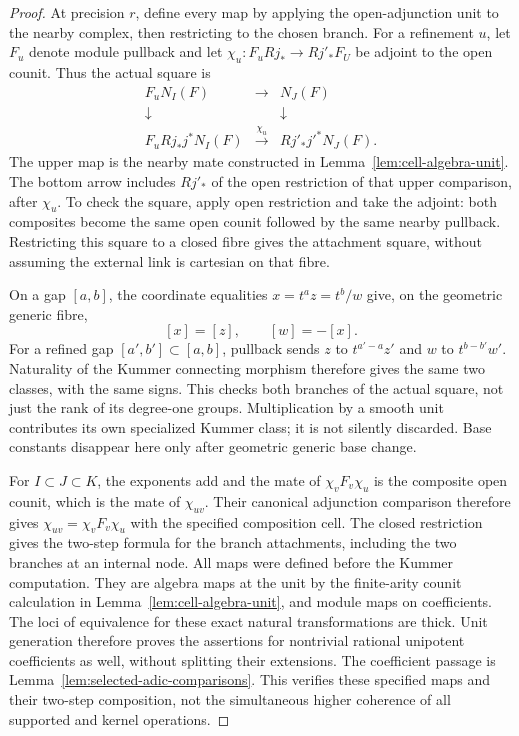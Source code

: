 \documentclass[11pt]{article}
\theoremstyle{definition}
\theoremstyle{remark}
\begin{document}
\begin{proof}
At precision $r$, define every map by applying the open-adjunction
unit to the nearby complex, then restricting to the chosen branch.
For a refinement $u$, let $F_u$ denote module pullback and let
$\chi_u:F_uRj_*\to Rj'_*F_U$ be adjoint to the open counit.
Thus the actual square is
\[
\begin{array}{ccc}
 F_uN_I(F)&\longrightarrow&N_J(F)\\
 \downarrow&&\downarrow\\
 F_uRj_*j^*N_I(F)&\xrightarrow{\chi_u}&Rj'_*j'^*N_J(F).
\end{array}
\]
The upper map is the nearby mate constructed in
Lemma~\ref{lem:cell-algebra-unit}.  The bottom arrow includes $Rj'_*$ of the open
restriction of that upper comparison, after $\chi_u$.  To check the square, apply open
restriction and take the adjoint: both composites become the same
open counit followed by the same nearby pullback.  Restricting this
square to a closed fibre gives the attachment square, without
assuming the external link is cartesian on that fibre.

On a gap $[a,b]$, the coordinate equalities
$x=t^az=t^b/w$ give, on the geometric generic fibre,
\[
 [x]=[z],\qquad [w]=-[x].
\]
For a refined gap $[a',b']\subset[a,b]$, pullback sends
$z$ to $t^{a'-a}z'$ and $w$ to $t^{b-b'}w'$.  Naturality of the
Kummer connecting morphism therefore gives the same two classes,
with the same signs.  This checks both branches of the actual square,
not just the rank of its degree-one groups.  Multiplication by a
smooth unit contributes its own specialized Kummer class; it is not
silently discarded.  Base constants disappear here only after
geometric generic base change.

For $I\subset J\subset K$, the exponents add and the mate of
$\chi_vF_v\chi_u$ is the composite open counit, which is the mate
of $\chi_{uv}$.  Their canonical adjunction comparison therefore
gives $\chi_{uv}=\chi_vF_v\chi_u$ with the specified composition cell.
The closed restriction gives the two-step formula for the branch
attachments, including the two branches at an internal node.
All maps were defined before the Kummer computation.  They are
algebra maps at the unit by the finite-arity counit calculation in
Lemma~\ref{lem:cell-algebra-unit}, and module maps on coefficients.
The loci of equivalence for these exact natural transformations
are thick.  Unit generation therefore proves the assertions for
nontrivial rational unipotent coefficients as well, without
splitting their extensions.  The coefficient passage is
Lemma~\ref{lem:selected-adic-comparisons}.  This verifies these
specified maps and their two-step composition, not the simultaneous
higher coherence of all supported and kernel operations.
\end{proof}
\end{document}
